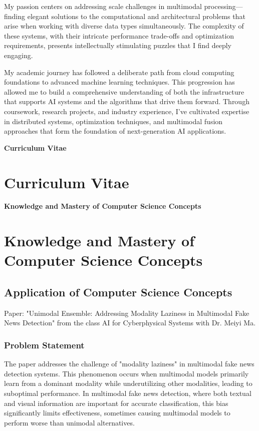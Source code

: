 \documentclass[12pt,letterpaper]{report}
\newcommand{\sectiondivider}[1]{%
    \clearpage
    \thispagestyle{empty}
    \begin{center}
        \vspace*{\fill}
        {\Huge\bfseries\textcolor{vanderbiltblack}{#1}}
        \vspace*{\fill}
    \end{center}
    \clearpage
}
\begin{document}
My passion centers on addressing scale challenges in multimodal processing—finding elegant solutions to the computational and architectural problems that arise when working with diverse data types simultaneously. The complexity of these systems, with their intricate performance trade-offs and optimization requirements, presents intellectually stimulating puzzles that I find deeply engaging.

My academic journey has followed a deliberate path from cloud computing foundations to advanced machine learning techniques. This progression has allowed me to build a comprehensive understanding of both the infrastructure that supports AI systems and the algorithms that drive them forward. Through coursework, research projects, and industry experience, I've cultivated expertise in distributed systems, optimization techniques, and multimodal fusion approaches that form the foundation of next-generation AI applications.

\sectiondivider{Curriculum Vitae}
\chapter{Curriculum Vitae}



% 

\sectiondivider{Knowledge and Mastery of Computer Science Concepts}
\chapter{Knowledge and Mastery of Computer Science Concepts}

\section{Application of Computer Science Concepts}
Paper: "Unimodal Ensemble: Addressing Modality Laziness in Multimodal Fake News Detection" from the class AI for Cyberphysical Systems with Dr. Meiyi Ma. 

\subsection{Problem Statement}
The paper addresses the challenge of "modality laziness" in multimodal fake news detection systems. This phenomenon occurs when multimodal models primarily learn from a dominant modality while underutilizing other modalities, leading to suboptimal performance. In multimodal fake news detection, where both textual and visual information are important for accurate classification, this bias significantly limits effectiveness, sometimes causing multimodal models to perform worse than unimodal alternatives.
\end{document}
